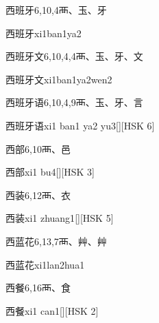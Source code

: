 \begin{Entry}{西班牙}{6,10,4}{⾑、⽟、⽛}
  \begin{Phonetics}{西班牙}{xi1ban1ya2}
  \end{Phonetics}
\end{Entry}

\begin{Entry}{西班牙文}{6,10,4,4}{⾑、⽟、⽛、⽂}
  \begin{Phonetics}{西班牙文}{xi1ban1ya2wen2}
  \end{Phonetics}
\end{Entry}

\begin{Entry}{西班牙语}{6,10,4,9}{⾑、⽟、⽛、⾔}
  \begin{Phonetics}{西班牙语}{xi1 ban1 ya2 yu3}[][HSK 6]
  \end{Phonetics}
\end{Entry}

\begin{Entry}{西部}{6,10}{⾑、⾢}
  \begin{Phonetics}{西部}{xi1 bu4}[][HSK 3]
  \end{Phonetics}
\end{Entry}

\begin{Entry}{西装}{6,12}{⾑、⾐}
  \begin{Phonetics}{西装}{xi1 zhuang1}[][HSK 5]
  \end{Phonetics}
\end{Entry}

\begin{Entry}{西蓝花}{6,13,7}{⾑、⾋、⾋}
  \begin{Phonetics}{西蓝花}{xi1lan2hua1}
  \end{Phonetics}
\end{Entry}

\begin{Entry}{西餐}{6,16}{⾑、⾷}
  \begin{Phonetics}{西餐}{xi1 can1}[][HSK 2]
  \end{Phonetics}
\end{Entry}

